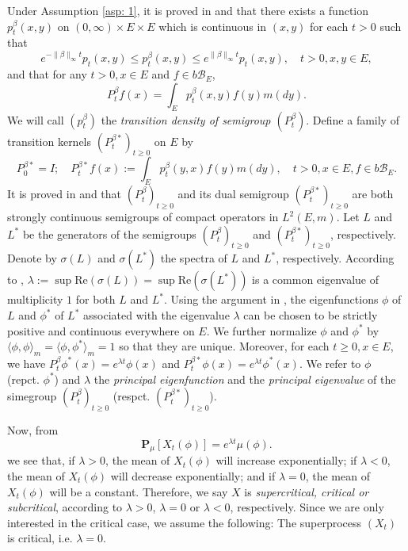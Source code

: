 \documentclass[12pt, a4paper]{amsart}
\theoremstyle{definition}
\newenvironment{asp}[1]{\renewcommand\theinnerasp{#1}\innerasp}{\endinnerasp}
\numberwithin{equation}{section}
\begin{document}
	Under Assumption \ref{asp: 1}, it is proved in \cite{RenSongZhang2015Limit} and \cite{RenSongZhang2017Central} that there exists a function $p^\beta_t(x,y)$ on $(0,\infty) \times E \times E$ which is continuous in $(x,y)$ for each $t>0$ such that
\[
	e^{-\|\beta\|_\infty t} p_t(x,y)
	\leq p^{\beta}_t(x,y)
	\leq e^{\|\beta\|_\infty t} p_t(x,y),
	\quad t>0, x, y\in E,
\]
	and that for any $t>0, x\in E$ and $f \in b\mathscr B_E$,
\[
	P^\beta_t f(x)
	= \int_E p_t^\beta (x,y) f(y) m(dy).
\]
	We will call $(p^\beta_t)$ the \emph{transition density of semigroup $(P^\beta_t)$}.
	Define a family of transition kernels $(P^{\beta *}_t)_{t \geq 0}$ on $E$ by
\[
	P^{\beta *}_0 = I;
	\quad P^{\beta *}_t f(x)
	:= \int_E p^\beta_t (y,x) f(y) m(dy),
	\quad t>0, x\in E, f\in b\mathscr B_E.
\]
	It is proved in \cite{RenSongZhang2015Limit} and \cite{RenSongZhang2017Central} that $(P^\beta_t)_{t \geq 0}$ and its dual semigroup $(P^{\beta *}_t)_{t \geq 0}$ are both strongly continuous semigroups of compact operators in $L^2(E,m)$.
	Let $L$ and $L^*$ be the generators of the semigroups $(P^\beta_t)_{t \geq 0}$ and $(P^{\beta *}_t)_{t \geq 0}$, respectively.
	Denote by $\sigma(L)$ and $\sigma(L^*)$ the spectra of $L$ and $L^*$, respectively.
	According to \cite[Theorem V.6.6.]{Schaefer1974Banach}, $\lambda := \sup \text{Re}(\sigma(L)) = \sup \text{Re}(\sigma(L^*))$ is a common eigenvalue of multiplicity $1$ for both $L$ and $L^*$.
	Using the argument in \cite{RenSongZhang2015Limit}, the eigenfunctions $\phi$ of $L$ and $\phi^*$ of $L^*$ associated with the eigenvalue $\lambda$ can be chosen to be strictly positive and continuous everywhere on $E$.
	We further normalize $\phi$ and $\phi^*$ by $\langle\phi, \phi\rangle_m = \langle\phi,\phi^*\rangle_m = 1$ so that they are unique.
	Moreover, for each $t\geq 0,x\in E$, we have $P^\beta_t \phi^*(x) = e^{\lambda t} \phi(x)$ and $P^{\beta *}_t \phi(x) = e^{\lambda t} \phi^*(x)$. 
	We refer to $\phi$ (repct. $\phi^*$) and $\lambda$ the \emph{principal eigenfunction} and the \emph{principal eigenvalue} of the simegroup $(P^\beta_t)_{t\geq 0}$ (respct. $(P^{\beta *}_t)_{t\geq 0}$).
	
	Now, from
\[
	\mathbf P_\mu[X_t(\phi)] 
	= e^{\lambda t} \mu(\phi).
\]  
	we see that, if $\lambda > 0$, the mean of $X_t(\phi)$ will increase exponentially; if $\lambda < 0$, the mean of $X_t(\phi)$ will decrease exponentially; and if $\lambda = 0$, the mean of $X_t(\phi)$ will be a constant. 
	Therefore, we say $X$ is \emph{supercritical, critical or subcritical}, according to $\lambda > 0$, $\lambda = 0$ or $\lambda < 0$, respectively.
	Since we are only interested in the critical case, we assume the following:
\begin{asp}{2} \label{asp: 2}
	The superprocess $(X_t)$ is critical, i.e. $\lambda = 0$.
\end{asp}
\end{document}
